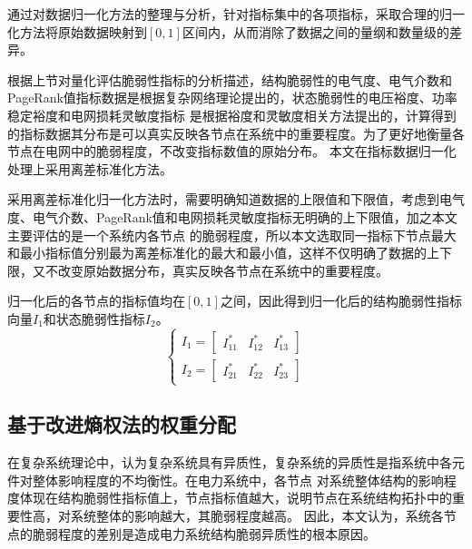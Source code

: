 通过对数据归一化方法的整理与分析，针对指标集中的各项指标，采取合理的归一化方法将原始数据映射到$\left[0,1\right]$区间内，从而消除了数据之间的量纲和数量级的差异。

根据上节对量化评估脆弱性指标的分析描述，结构脆弱性的电气度、电气介数和PageRank值指标数据是根据复杂网络理论提出的，状态脆弱性的电压裕度、功率稳定裕度和电网损耗灵敏度指标
是根据裕度和灵敏度相关方法提出的，计算得到的指标数据其分布是可以真实反映各节点在系统中的重要程度。为了更好地衡量各节点在电网中的脆弱程度，不改变指标数值的原始分布。
本文在指标数据归一化处理上采用离差标准化方法。

采用离差标准化归一化方法时，需要明确知道数据的上限值和下限值，考虑到电气度、电气介数、PageRank值和电网损耗灵敏度指标无明确的上下限值，加之本文主要评估的是一个系统内各节点
的脆弱程度，所以本文选取同一指标下节点最大和最小指标值分别最为离差标准化的最大和最小值，这样不仅明确了数据的上下限，又不改变原始数据分布，真实反映各节点在系统中的重要程度。

归一化后的各节点的指标值均在$\left[0,1\right]$之间，因此得到归一化后的结构脆弱性指标向量$I_1$和状态脆弱性指标$I_2$。
\begin{equation}
  \left\{\begin{array}{l}{I_{1}=\left[\begin{array}{lll}{I_{11}^{*}} & {I_{12}^{*}} & {I_{13}^{*}}\end{array}\right]} \\
   {I_{2}=\left[\begin{array}{lll}{I_{21}^{*}} & {I_{22}^{*}} & {I_{23}^{*}}\end{array}\right]}\end{array}\right.
  \end{equation}

  
\subsection{基于改进熵权法的权重分配}
\label{sec:nomalz}
在复杂系统理论中，认为复杂系统具有异质性，复杂系统的异质性是指系统中各元件对整体影响程度的不均衡性。在电力系统中，各节点
对系统整体结构的影响程度体现在结构脆弱性指标值上，节点指标值越大，说明节点在系统结构拓扑中的重要性高，对系统整体的影响越大，其脆弱程度越高。
因此，本文认为，系统各节点的脆弱程度的差别是造成电力系统结构脆弱异质性的根本原因。


